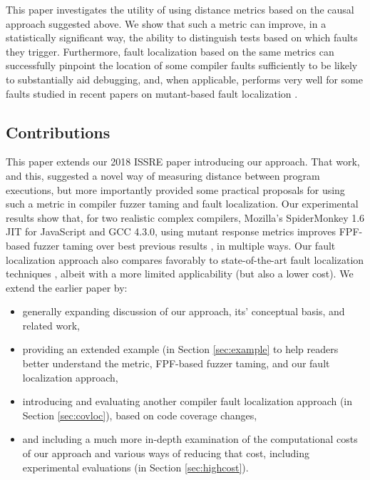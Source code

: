 This paper investigates the utility of using distance metrics based on the causal approach suggested above.  We show that such a metric can improve, in a statistically significant way, the ability to distinguish tests based on which faults they trigger.  Furthermore, fault localization based on the same metrics can successfully pinpoint the location of some compiler faults sufficiently to be likely to substantially aid debugging, and, when applicable, performs very well for some faults studied in recent papers on mutant-based fault localization \cite{multilingual,Papadakis}.

\subsection{Contributions}

This paper extends our 2018 ISSRE paper \cite{ISSRE18Mutants} introducing our approach. That work, and this, suggested a novel way of measuring distance between program executions, but more importantly provided some practical proposals for using such a metric in compiler fuzzer taming and fault localization.  Our experimental results show that, for two realistic complex compilers, Mozilla's SpiderMonkey 1.6 JIT for JavaScript and GCC 4.3.0, using mutant response metrics improves FPF-based fuzzer taming over best previous results \cite{PLDI13}, in multiple ways.  Our fault localization approach also compares favorably to state-of-the-art fault localization techniques \cite{MUSE,multilingual,Metallaxis}, albeit with a more limited applicability (but also a lower cost).  We extend the earlier paper by:

\begin{itemize}
\item generally expanding discussion of our approach, its' conceptual basis, and related work,
\item providing an extended example (in Section \ref{sec:example} to help readers better understand the metric, FPF-based fuzzer taming, and our fault localization approach,
\item introducing and evaluating another compiler fault localization approach (in Section \ref{sec:covloc}), based on code coverage changes,
\item and including a much more in-depth examination of the computational costs of our approach and various ways of reducing that cost, including experimental evaluations (in Section \ref{sec:highcost}).
\end{itemize}